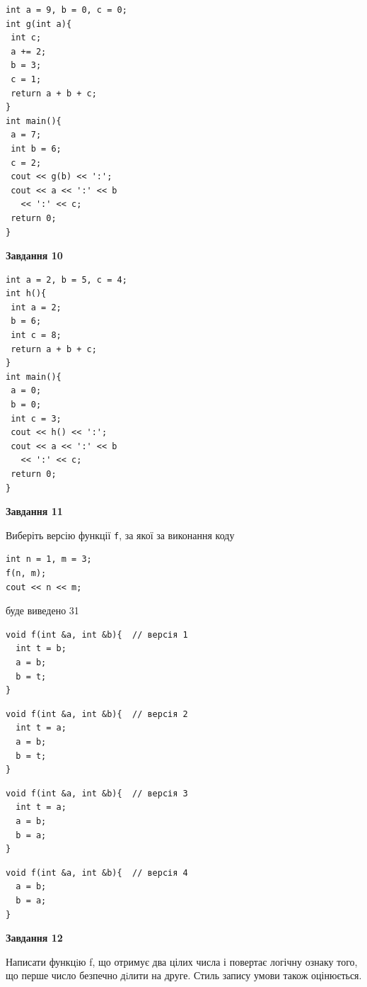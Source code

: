 \documentclass[12pt, ukrainian]{article}
\def\code#1{\Verb!#1!}
\begin{document}
{\begin {large}
\begin{minipage}[t]{7.0cm}
\begin{verbatim}
int a = 9, b = 0, c = 0;
int g(int a){
 int c;
 a += 2;
 b = 3;
 c = 1;
 return a + b + c;
}
int main(){
 a = 7;
 int b = 6;
 c = 2;
 cout << g(b) << ':';
 cout << a << ':' << b 
   << ':' << c;
 return 0;
}
\end{verbatim}



\begin{center}
\textbf{Завдання 10}
\end{center}
\vspace{-8mm}

\begin{verbatim}
int a = 2, b = 5, c = 4;
int h(){
 int a = 2;
 b = 6;
 int c = 8;
 return a + b + c;
}
int main(){
 a = 0;
 b = 0;
 int c = 3;
 cout << h() << ':';
 cout << a << ':' << b 
   << ':' << c;
 return 0;
}
\end{verbatim}

\end{minipage}
\vline \hspace{1mm}
\begin{minipage}[t]{11.0cm}

\begin{center}
\textbf{Завдання 11}
\end{center}
Виберіть версію функції \code{f}, за якої за виконання коду
\begin{verbatim}
int n = 1, m = 3;
f(n, m);
cout << n << m;
\end{verbatim}

буде виведено 31

\begin{verbatim}
void f(int &a, int &b){  // версія 1
  int t = b;
  a = b;
  b = t;
}
\end{verbatim}

\vspace{-8mm}\begin{verbatim}
void f(int &a, int &b){  // версія 2
  int t = a;
  a = b;
  b = t;
}
\end{verbatim}

\vspace{-8mm}\begin{verbatim}
void f(int &a, int &b){  // версія 3
  int t = a;
  a = b;
  b = a;
}
\end{verbatim}

\vspace{-8mm}\begin{verbatim}
void f(int &a, int &b){  // версія 4
  a = b;
  b = a;
}
\end{verbatim}



\begin{center}
\textbf{Завдання 12}
\end{center}

Написати функцiю f, що отримує два цілих числа і повертає логічну ознаку того, що перше число безпечно дiлити на друге. Стиль запису умови також оцінюється.\par

\end{minipage}

\end {large}}
\newpage
\end{document}
